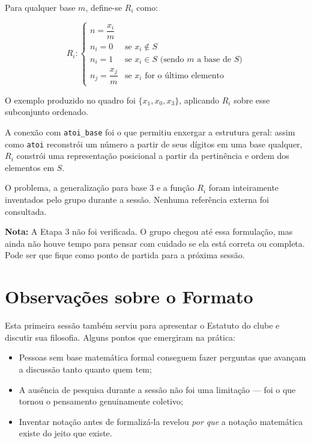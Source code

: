 \documentclass[12pt, a4paper]{article}
\begin{document}
Para qualquer base $m$, define-se $R_i$ como:

$$
R_i: \begin{cases}
  n = \dfrac{x_i}{m} \\[6pt]
  n_i = 0 & \text{se } x_i \notin S \\[4pt]
  n_i = 1 & \text{se } x_i \in S \text{ (sendo } m \text{ a base de } S\text{)} \\[4pt]
  n_j = \dfrac{x_j}{m} & \text{se } x_i \text{ for o último elemento}
\end{cases}
$$

O exemplo produzido no quadro foi $\{x_1, x_0, x_3\}$, aplicando $R_i$ sobre esse subconjunto ordenado.

A conexão com \texttt{atoi\_base} foi o que permitiu enxergar a estrutura geral: assim como \texttt{atoi} reconstrói um número a partir de seus dígitos em uma base qualquer, $R_i$ constrói uma representação posicional a partir da pertinência e ordem dos elementos em $S$.

\begin{infobox}
  O problema, a generalização para base 3 e a função $R_i$ foram inteiramente inventados pelo grupo durante a sessão. Nenhuma referência externa foi consultada.
\end{infobox}

\begin{tcolorbox}[enhanced, colback=white, colframe=cinza!50, boxrule=0.8pt, arc=4pt,
  left=8pt, right=8pt, top=6pt, bottom=6pt]
  \textbf{Nota:} A Etapa 3 não foi verificada. O grupo chegou até essa formulação, mas ainda não houve tempo para pensar com cuidado se ela está correta ou completa. Pode ser que fique como ponto de partida para a próxima sessão.
\end{tcolorbox}

\section{Observações sobre o Formato}

Esta primeira sessão também serviu para apresentar o Estatuto do clube e discutir sua filosofia. Alguns pontos que emergiram na prática:

\begin{itemize}
  \item Pessoas sem base matemática formal conseguem fazer perguntas que avançam a discussão tanto quanto quem tem;
  \item A ausência de pesquisa durante a sessão não foi uma limitação --- foi o que tornou o pensamento genuinamente coletivo;
  \item Inventar notação antes de formalizá-la revelou \textit{por que} a notação matemática existe do jeito que existe.
\end{itemize}
\end{document}
